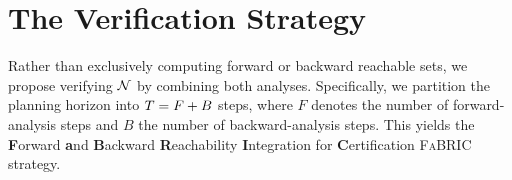 \documentclass[letterpaper, 10 pt, conference]{ieeeconf}  %
\begin{document}
\section{The \fab Verification Strategy}
\label{sec:fabre}
Rather than exclusively computing forward or backward reachable sets, we propose verifying $\mathcal{N}$ by combining both analyses. 
Specifically, we partition the planning horizon into $T = F + B$ steps, where $F$ denotes the number of forward-analysis steps and $B$ the number of backward-analysis steps. This yields the \textbf{F}orward \textbf{a}nd \textbf{B}ackward \textbf{R}eachability \textbf{I}ntegration for \textbf{C}ertification \textsc{FaBRIC} strategy.
\begin{table}[h!]
    \centering
    \caption{Comparing \dripy to HyBReach-MILP. Times in seconds; Vol.\ is the
      outer-set volume after five backward steps. Improvement is the signed
      ratio to unrefined \dripy: $r>0$ is $r\times$ better, $r<0$ is
      $|r|\times$ worse.}
\end{table}
\end{document}
